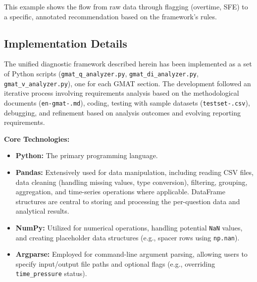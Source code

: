\documentclass{article}
\begin{document}
This example shows the flow from raw data through flagging (overtime, SFE) to a specific, annotated recommendation based on the framework's rules.

\subsection{Implementation Details}

The unified diagnostic framework described herein has been implemented as a set of Python scripts (\texttt{gmat\_q\_analyzer.py}, \texttt{gmat\_di\_analyzer.py}, \texttt{gmat\_v\_analyzer.py}), one for each GMAT section. The development followed an iterative process involving requirements analysis based on the methodological documents (\texttt{en-gmat-\*.md}), coding, testing with sample datasets (\texttt{testset-\*.csv}), debugging, and refinement based on analysis outcomes and evolving reporting requirements.

\textbf{Core Technologies:}
\begin{itemize}
    \item \textbf{Python:} The primary programming language.
    \item \textbf{Pandas:} Extensively used for data manipulation, including reading CSV files, data cleaning (handling missing values, type conversion), filtering, grouping, aggregation, and time-series operations where applicable. DataFrame structures are central to storing and processing the per-question data and analytical results.
    \item \textbf{NumPy:} Utilized for numerical operations, handling potential \texttt{NaN} values, and creating placeholder data structures (e.g., spacer rows using \texttt{np.nan}).
    \item \textbf{Argparse:} Employed for command-line argument parsing, allowing users to specify input/output file paths and optional flags (e.g., overriding \texttt{time\_pressure} status).
\end{itemize}
\end{document}
